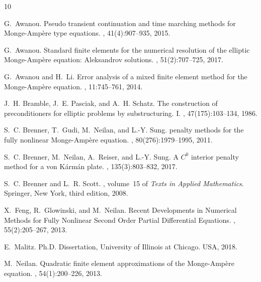 \documentclass[12pt]{amsart}
\numberwithin{equation}{section}
\begin{document}
\begin{thebibliography}{10}

G.~Awanou.
\newblock Pseudo transient continuation and time marching methods for
  {M}onge-{A}mp\`ere type equations.
, 41(4):907--935, 2015.

G.~Awanou.
\newblock Standard finite elements for the numerical resolution of the elliptic
  {M}onge-{A}mp\`ere equation: {A}leksandrov solutions.
, 51(2):707--725, 2017.

G.~Awanou and H.~Li.
\newblock Error analysis of a mixed finite element method for the
  {M}onge-{A}mp\`ere equation.
, 11:745--761, 2014.

J.~H. Bramble, J.~E. Pasciak, and A.~H. Schatz.
\newblock The construction of preconditioners for elliptic problems by
  substructuring. {I}.
, 47(175):103--134, 1986.

S.~C. Brenner, T.~Gudi, M.~Neilan, and L.-Y. Sung.
 penalty methods for the fully nonlinear {M}onge-{A}mp\`ere
  equation.
, 80(276):1979--1995, 2011.

S.~C. Brenner, M.~Neilan, A.~Reiser, and L.-Y. Sung.
\newblock A {$C^0$} interior penalty method for a von {K}\'arm\'an plate.
, 135(3):803--832, 2017.

S.~C. Brenner and L.~R. Scott.
, volume~15 of
  {\em Texts in Applied Mathematics}.
\newblock Springer, New York, third edition, 2008.

X.~Feng, R.~Glowinski, and M.~Neilan.
\newblock Recent {D}evelopments in {N}umerical {M}ethods for {F}ully
  {N}onlinear {S}econd {O}rder {P}artial {D}ifferential {E}quations.
, 55(2):205--267, 2013.

E.~Malitz.
\newblock Ph.D. Dissertation, University of Illinois at Chicago. USA, 2018.

M.~Neilan.
\newblock Quadratic finite element approximations of the {M}onge-{A}mp\`ere
  equation.
, 54(1):200--226, 2013.


\end{thebibliography}
\end{document}
